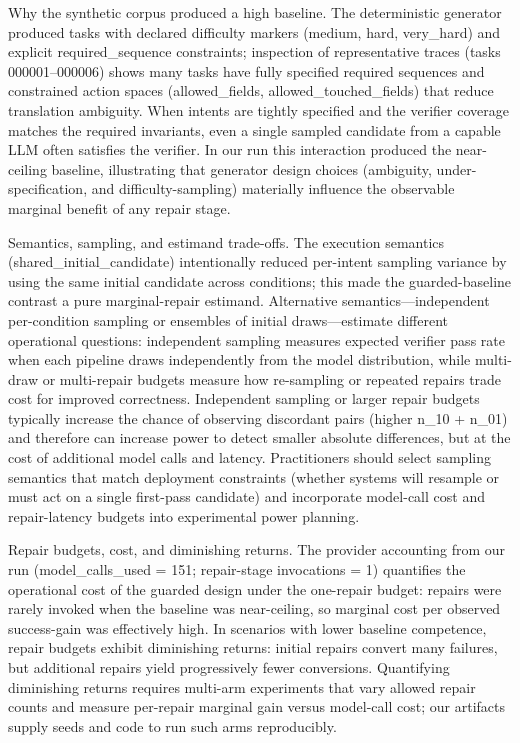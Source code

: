 \documentclass[conference]{IEEEtran}
\begin{document}
Why the synthetic corpus produced a high baseline. The deterministic generator produced tasks with declared difficulty markers (medium, hard, very\_hard) and explicit required\_sequence constraints; inspection of representative traces (tasks 000001--000006) shows many tasks have fully specified required sequences and constrained action spaces (allowed\_fields, allowed\_touched\_fields) that reduce translation ambiguity. When intents are tightly specified and the verifier coverage matches the required invariants, even a single sampled candidate from a capable LLM often satisfies the verifier. In our run this interaction produced the near-ceiling baseline, illustrating that generator design choices (ambiguity, under-specification, and difficulty-sampling) materially influence the observable marginal benefit of any repair stage.

Semantics, sampling, and estimand trade-offs. The execution semantics (shared\_initial\_candidate) intentionally reduced per-intent sampling variance by using the same initial candidate across conditions; this made the guarded-baseline contrast a pure marginal-repair estimand. Alternative semantics---independent per-condition sampling or ensembles of initial draws---estimate different operational questions: independent sampling measures expected verifier pass rate when each pipeline draws independently from the model distribution, while multi-draw or multi-repair budgets measure how re-sampling or repeated repairs trade cost for improved correctness. Independent sampling or larger repair budgets typically increase the chance of observing discordant pairs (higher n\_10 + n\_01) and therefore can increase power to detect smaller absolute differences, but at the cost of additional model calls and latency. Practitioners should select sampling semantics that match deployment constraints (whether systems will resample or must act on a single first-pass candidate) and incorporate model-call cost and repair-latency budgets into experimental power planning.

Repair budgets, cost, and diminishing returns. The provider accounting from our run (model\_calls\_used = 151; repair-stage invocations = 1) quantifies the operational cost of the guarded design under the one-repair budget: repairs were rarely invoked when the baseline was near-ceiling, so marginal cost per observed success-gain was effectively high. In scenarios with lower baseline competence, repair budgets exhibit diminishing returns: initial repairs convert many failures, but additional repairs yield progressively fewer conversions. Quantifying diminishing returns requires multi-arm experiments that vary allowed repair counts and measure per-repair marginal gain versus model-call cost; our artifacts supply seeds and code to run such arms reproducibly.
\end{document}
